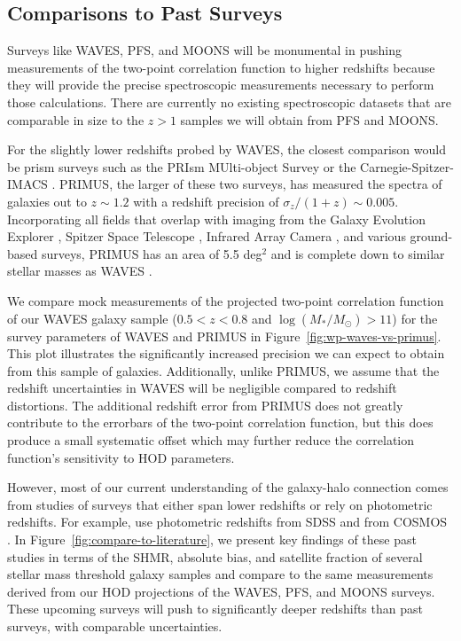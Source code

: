 \documentclass[twocolumn,twocolappendix]{aastex63}
\begin{document}
\subsection{Comparisons to Past Surveys}

Surveys like WAVES, PFS, and MOONS will be monumental in pushing measurements of the two-point correlation function to higher redshifts because they will provide the precise spectroscopic measurements necessary to perform those calculations. There are currently no existing spectroscopic datasets that are comparable in size to the $z > 1$ samples we will obtain from PFS and MOONS.

For the slightly lower redshifts probed by WAVES, the closest comparison would be prism surveys such as the PRIsm MUlti-object Survey \citep[PRIMUS;][]{Coil:2011} or the Carnegie-Spitzer-IMACS \citep[CSI;][]{Kelson:2014}. PRIMUS, the larger of these two surveys, has measured the spectra of galaxies out to $z \sim 1.2$ with a redshift precision of $\sigma_z / (1+z) \sim 0.005$. Incorporating all fields that overlap with imaging from the Galaxy Evolution Explorer \citep[GALEX;][]{Martin:2005}, Spitzer Space Telescope \citep{Werner:2004}, Infrared Array Camera \citep[IRAC;][]{Fazio:2004}, and various ground-based surveys, PRIMUS has an area of 5.5 deg$^2$ and is complete down to similar stellar masses as WAVES \citep[see][]{Moustakas:2013}.

We compare mock measurements of the projected two-point correlation function of our WAVES galaxy sample ($0.5 < z < 0.8$ and $\log(M_\ast / M_\odot) > 11$) for the survey parameters of WAVES and PRIMUS in Figure~\ref{fig:wp-waves-vs-primus}. This plot illustrates the significantly increased precision we can expect to obtain from this sample of galaxies. Additionally, unlike PRIMUS, we assume that the redshift uncertainties in WAVES will be negligible compared to redshift distortions. The additional redshift error from PRIMUS does not greatly contribute to the errorbars of the two-point correlation function, but this does produce a small systematic offset which may further reduce the correlation function's sensitivity to HOD parameters.

However, most of our current understanding of the galaxy-halo connection comes from studies of surveys that either span lower redshifts or rely on photometric redshifts. For example, \citet{Zu:Mandelbaum:2015} use photometric redshifts from SDSS \citep{Blanton:2017} and \citet{Leauthaud:2012} from COSMOS \citep{Scoville:2007}. In Figure~\ref{fig:compare-to-literature}, we present key findings of these past studies in terms of the SHMR, absolute bias, and satellite fraction of several stellar mass threshold galaxy samples and compare to the same measurements derived from our HOD projections of the WAVES, PFS, and MOONS surveys. These upcoming surveys will push to significantly deeper redshifts than past surveys, with comparable uncertainties. 
\end{document}
